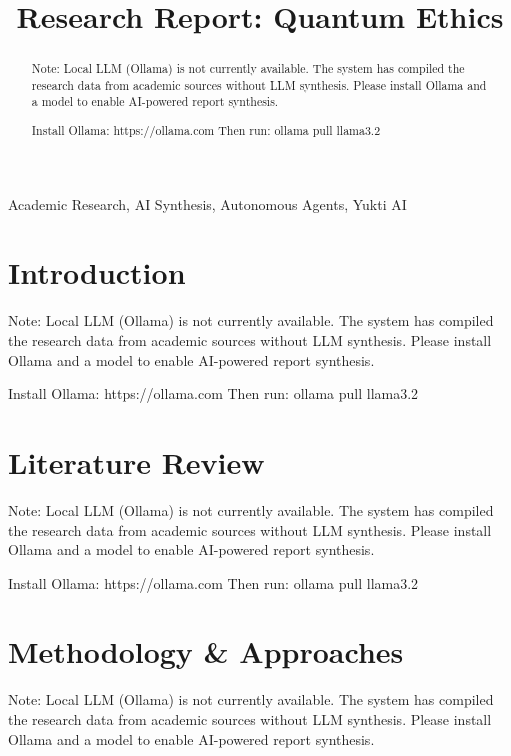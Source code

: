 \documentclass[conference]{IEEEtran}
\begin{document}
\title{Research Report: Quantum Ethics}

\author{
}

\maketitle

\begin{abstract}
Note: Local LLM (Ollama) is not currently available. The system has compiled the research data from academic sources without LLM synthesis. Please install Ollama and a model to enable AI-powered report synthesis.

Install Ollama: https://ollama.com
Then run: ollama pull llama3.2
\end{abstract}

\begin{IEEEkeywords}
Academic Research, AI Synthesis, Autonomous Agents, Yukti AI
\end{IEEEkeywords}

\section{Introduction}
Note: Local LLM (Ollama) is not currently available. The system has compiled the research data from academic sources without LLM synthesis. Please install Ollama and a model to enable AI-powered report synthesis.

Install Ollama: https://ollama.com
Then run: ollama pull llama3.2

\section{Literature Review}
Note: Local LLM (Ollama) is not currently available. The system has compiled the research data from academic sources without LLM synthesis. Please install Ollama and a model to enable AI-powered report synthesis.

Install Ollama: https://ollama.com
Then run: ollama pull llama3.2

\section{Methodology \& Approaches}
Note: Local LLM (Ollama) is not currently available. The system has compiled the research data from academic sources without LLM synthesis. Please install Ollama and a model to enable AI-powered report synthesis.
\end{document}
